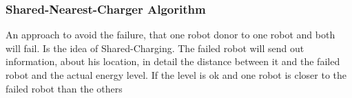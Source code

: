 \documentclass[
	a4paper,
	article,
	pagesize,
	pdftex,
	12pt,
	english,
	fleqn,
	final,
	]{scrartcl}
\begin{document}
\subsubsection{Shared-Nearest-Charger Algorithm}
An approach to avoid the failure, that one robot donor to one robot and both will fail. Is the idea of Shared-Charging. The failed robot will send out information, about his location, in detail the distance between it and the failed robot and the actual energy level. If the level is ok and one robot is closer to the failed robot than the others
\end{document}
